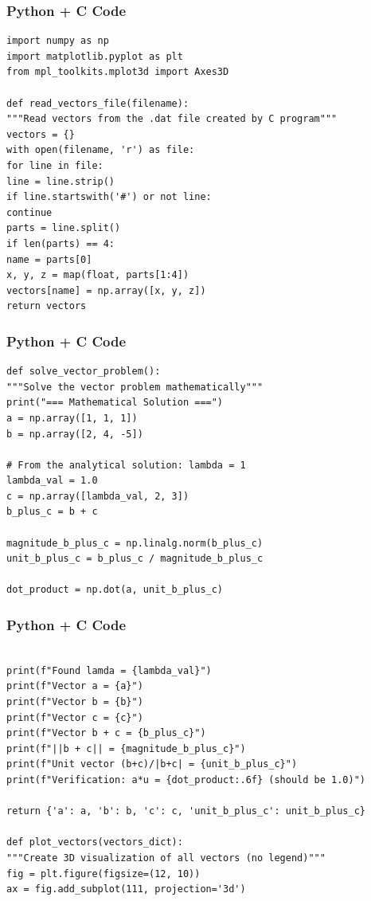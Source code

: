 \documentclass{beamer}
\begin{document}
\begin{frame}[fragile]
    \frametitle{Python + C Code}
    \begin{lstlisting}
import numpy as np
import matplotlib.pyplot as plt
from mpl_toolkits.mplot3d import Axes3D

def read_vectors_file(filename):
"""Read vectors from the .dat file created by C program"""
vectors = {}
with open(filename, 'r') as file:
for line in file:
line = line.strip()
if line.startswith('#') or not line:
continue
parts = line.split()
if len(parts) == 4:
name = parts[0]
x, y, z = map(float, parts[1:4])
vectors[name] = np.array([x, y, z])
return vectors
\end{lstlisting}
\end{frame}

\begin{frame}[fragile]
    \frametitle{Python + C Code}
    \begin{lstlisting}
def solve_vector_problem():
"""Solve the vector problem mathematically"""
print("=== Mathematical Solution ===")
a = np.array([1, 1, 1])
b = np.array([2, 4, -5])

# From the analytical solution: lambda = 1
lambda_val = 1.0
c = np.array([lambda_val, 2, 3])
b_plus_c = b + c

magnitude_b_plus_c = np.linalg.norm(b_plus_c)
unit_b_plus_c = b_plus_c / magnitude_b_plus_c

dot_product = np.dot(a, unit_b_plus_c)
    \end{lstlisting}
\end{frame}


\begin{frame}[fragile]
    \frametitle{Python + C Code}
    \begin{lstlisting}

print(f"Found lamda = {lambda_val}")
print(f"Vector a = {a}")
print(f"Vector b = {b}")
print(f"Vector c = {c}")
print(f"Vector b + c = {b_plus_c}")
print(f"||b + c|| = {magnitude_b_plus_c}")
print(f"Unit vector (b+c)/|b+c| = {unit_b_plus_c}")
print(f"Verification: a*u = {dot_product:.6f} (should be 1.0)")

return {'a': a, 'b': b, 'c': c, 'unit_b_plus_c': unit_b_plus_c}

def plot_vectors(vectors_dict):
"""Create 3D visualization of all vectors (no legend)"""
fig = plt.figure(figsize=(12, 10))
ax = fig.add_subplot(111, projection='3d')


    \end{lstlisting}
\end{frame}
\end{document}
